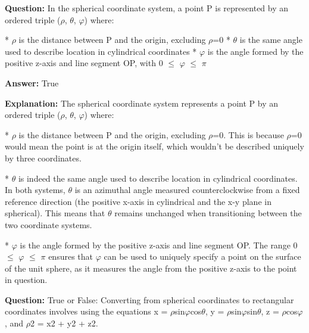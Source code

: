 \documentclass{article}
\begin{document}
                \vspace{0.5cm} 
        
            
                \textbf {Question:} In the spherical coordinate system, a point P is represented by an ordered triple (\ensuremath{\rho}, \ensuremath{\theta}, \ensuremath{\varphi}) where:

* \ensuremath{\rho} is the distance between P and the origin, excluding \ensuremath{\rho}=0
* \ensuremath{\theta} is the same angle used to describe location in cylindrical coordinates
* \ensuremath{\varphi} is the angle formed by the positive z-axis and line segment OP, with 0 \ensuremath{\leq} \ensuremath{\varphi} \ensuremath{\leq} \ensuremath{\pi}
                
                \textbf{Answer:} True

                \textbf{Explanation:} The spherical coordinate system represents a point P by an ordered triple (\ensuremath{\rho}, \ensuremath{\theta}, \ensuremath{\varphi}) where:

* \ensuremath{\rho} is the distance between P and the origin, excluding \ensuremath{\rho}=0. This is because \ensuremath{\rho}=0 would mean the point is at the origin itself, which wouldn't be described uniquely by three coordinates.

* \ensuremath{\theta} is indeed the same angle used to describe location in cylindrical coordinates. In both systems, \ensuremath{\theta} is an azimuthal angle measured counterclockwise from a fixed reference direction (the positive x-axis in cylindrical and the x-y plane in spherical). This means that \ensuremath{\theta} remains unchanged when transitioning between the two coordinate systems.

* \ensuremath{\varphi} is the angle formed by the positive z-axis and line segment OP. The range 0 \ensuremath{\leq} \ensuremath{\varphi} \ensuremath{\leq} \ensuremath{\pi} ensures that \ensuremath{\varphi} can be used to uniquely specify a point on the surface of the unit sphere, as it measures the angle from the positive z-axis to the point in question.
                
                \vspace{0.5cm} 
        
            
                \textbf {Question:} True or False: Converting from spherical coordinates to rectangular coordinates involves using the equations x = \ensuremath{\rho}sin\ensuremath{\varphi}cos\ensuremath{\theta}, y = \ensuremath{\rho}sin\ensuremath{\varphi}sin\ensuremath{\theta}, z = \ensuremath{\rho}cos\ensuremath{\varphi}, and \ensuremath{\rho}2 = x2 + y2 + z2.
                
\end{document}
